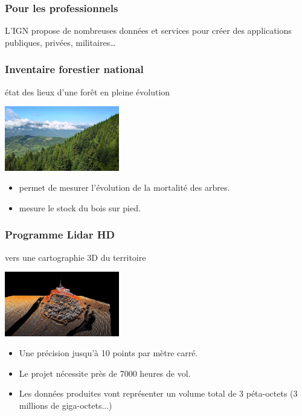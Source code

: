 \documentclass[svgnames,11pt]{beamer}
\begin{document}
\begin{frame}
    \frametitle{Pour les professionnels}

L'IGN propose de nombreuses données et services pour créer des applications publiques, privées, militaires\dots
\end{frame}
\begin{frame}
    \frametitle{Inventaire forestier national}
    état des lieux d’une forêt en pleine évolution
    \begin{center}
    \centering
    \includegraphics[width=5cm]{ressources/foret.jpg}
    \end{center}
\begin{itemize}
    \item permet de mesurer l'évolution de la mortalité des arbres.
    \item mesure le stock du bois sur pied.
\end{itemize}
\end{frame}
\begin{frame}
    \frametitle{Programme Lidar HD}
 vers une cartographie 3D du territoire 
    \begin{center}
    \centering
    \includegraphics[width=5cm]{ressources/lidar.jpg}
    \label{IMG}
    \end{center}
\begin{itemize}
    \item Une précision jusqu'à 10 points par mètre carré.
\item Le projet nécessite près de 7000 heures de vol.
\item Les données produites vont représenter un volume total de 3 péta-octets (3 millions de giga-octets...)
\end{itemize}
\end{frame}
\end{document}
